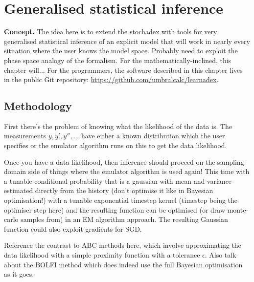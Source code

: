 \chapter{\sffamily Generalised statistical inference}

{\bfseries\sffamily Concept.} The idea here is to extend the stochadex with tools for very generalised statistical inference of an explicit model that will work in nearly every situation where the user knows the model space. Probably need to exploit the phase space analogy of the formalism. For the mathematically-inclined, this chapter will... For the programmers, the software described in this chapter lives in the public Git repository: \href{https://github.com/umbralcalc/learnadex}{https://github.com/umbralcalc/learnadex}.


\section{\sffamily Methodology}

First there's the problem of knowing what the likelihood of the data is. The measurements $y, y', y'', \dots$ have either a known distribution which the user specifies or the emulator algorithm runs on this to get the data likelihood.

Once you have a data likelihood, then inference should proceed on the sampling domain side of things where the emulator algorithm is used again! This time with a tunable conditional probability that is a gaussian with mean and variance estimated directly from the history (don't optimise it like in Bayesian optimisation!) with a tunable exponential timestep kernel (timestep being the optimiser step here) and the resulting function can be optimised (or draw monte-carlo samples from) in an EM algorithm approach. The resulting Gaussian function could also exploit gradients for SGD.

Reference the contrast to ABC methods here, which involve approximating the data likelihood with a simple proximity function with a tolerance $\epsilon$. Also talk about the BOLFI method which does indeed use the full Bayesian optimisation as it goes.

